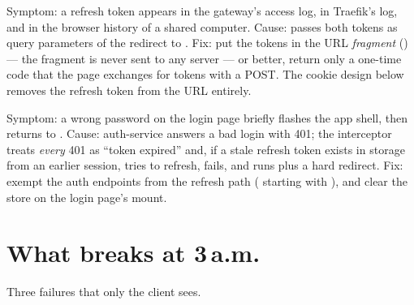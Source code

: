 \begin{pitfall}
Symptom: a refresh token appears in the gateway's access log, in
Traefik's log, and in the browser history of a shared computer. Cause:
 passes both tokens as query
parameters of the redirect to . Fix: put the
tokens in the URL \emph{fragment} () --- the
fragment is never sent to any server --- or better, return only a
one-time code that the page exchanges for tokens with a POST. The
cookie design below removes the refresh token from the URL entirely.
\end{pitfall}

\begin{pitfall}
Symptom: a wrong password on the login page briefly flashes the app
shell, then returns to . Cause: auth-service answers a
bad login with 401; the interceptor treats \emph{every} 401 as ``token
expired'' and, if a stale refresh token exists in storage from an
earlier session, tries to refresh, fails, and runs  plus
a hard redirect. Fix: exempt the auth endpoints from the refresh path
( starting with ), and clear the
store on the login page's mount.
\end{pitfall}

\section{What breaks at 3\,a.m.}

Three failures that only the client sees.

